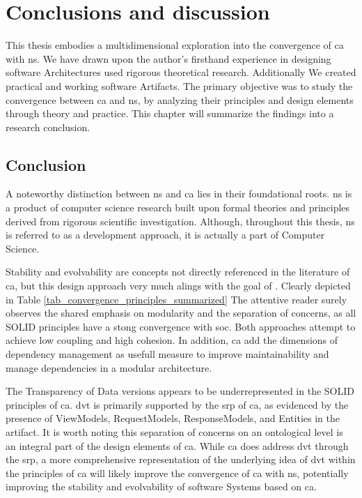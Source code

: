 \chapter{Conclusions and discussion} \label{chap_conclusions}

This thesis embodies a multidimensional exploration into the convergence of \gls{ca} with
\gls{ns}. We have drawn upon the author's firsthand experience in designing software
Architectures used rigorous theoretical research. Additionally We created practical and
working software Artifacts. The primary objective was to study the convergence between
\gls{ca} and \gls{ns}, by analyzing their principles and design elements through theory
and practice. This chapter will summarize the findings into a research conclusion.

\section{Conclusion}

A noteworthy distinction between \gls{ns} and \gls{ca} lies in their foundational roots.
\gls{ns} is a product of computer science research built upon formal theories and
principles derived from rigorous scientific investigation. Although, throughout this
thesis, \gls{ns} is referred to as a development approach, it is actually a part of
Computer Science.

Stability and evolvability are concepts not directly referenced in the literature of
\gls{ca}, but this design approach very much alings with the goal of
\textcite[31]{mannaert_normalized_2016}. Clearly depicted in Table
\ref{tab_convergence_principles_summarized} The attentive reader surely observes the
shared emphasis on modularity and the separation of concerns, as all SOLID principles have
a stong convergence with \gls{soc}. Both approaches attempt to achieve low coupling and
high cohesion. In addition, \gls{ca} add the dimensions of dependency management as
usefull measure to improve maintainability and manage dependencies in a modular
architecture.

The Transparency of Data versions appears to be underrepresented in the SOLID principles
of \gls{ca}. \gls{dvt} is primarily supported by the \gls{srp} of \gls{ca}, as evidenced
by the presence of ViewModels, RequestModels, ResponseModels, and Entities in the
artifact. It is worth noting this separation of concerns on an ontological level is an
integral part of the design elements of \gls{ca}. While \gls{ca} does address \gls{dvt}
through the \gls{srp}, a more comprehensive representation of the underlying idea of
\gls{dvt} within the principles of \gls{ca} will likely improve the convergence of
\gls{ca} with \gls{ns}, potentially improving the stability and evolvability of software
Systems based on \gls{ca}.

